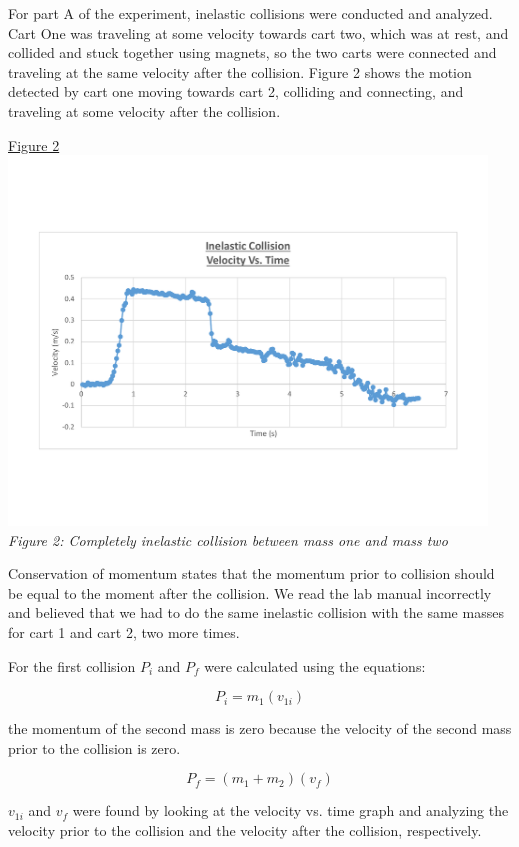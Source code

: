 \documentclass[aps,letterpaper,11pt]{revtex4}
\begin{document}
For part A of the experiment, inelastic collisions were conducted and analyzed. Cart One was traveling at some velocity towards cart two, which was at rest, and collided and stuck together using magnets, so the two carts were connected and traveling at the same velocity after the collision. Figure 2 shows the motion detected by cart one moving towards cart 2, colliding and connecting, and traveling at some velocity after the collision.

\begin{center}
\underline{Figure 2}\\
\includegraphics[width = 5in]{InelasticCollisionVelocityVsTime.pdf}\\
\textit{Figure 2: Completely inelastic collision between mass one and mass two}
\end{center}

Conservation of momentum states that the momentum prior to collision should be equal to the moment after the collision. We read the lab manual incorrectly and believed that we had to do the same inelastic collision with the same masses for cart 1 and cart 2, two more times. 

For the first collision $P_i$ and $P_f$ were calculated using the equations:

$$ P_i = m_1(v_{1i})$$

the momentum of the second mass is zero because the velocity of the second mass prior to the collision is zero.

$$ P_f = (m_1 + m_2)(v_f)$$

$v_{1i}$ and $v_f$ were found by looking at the velocity vs. time graph and analyzing the velocity prior to the collision and the velocity after the collision, respectively. 
\end{document}
